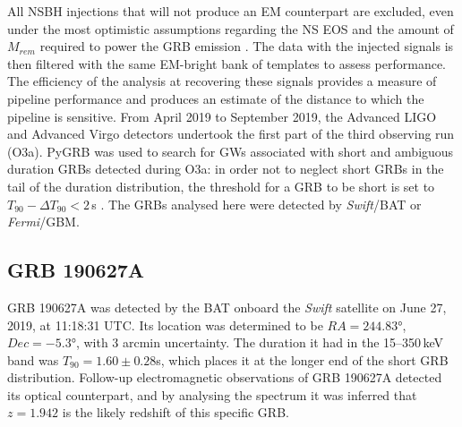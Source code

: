 \documentclass[binding=0.6cm, LaM]{sapthesis}
\begin{document}
	All NSBH injections that will not produce an EM counterpart are excluded, 
	even under the most optimistic assumptions regarding the NS EOS and the amount of $M_{rem}$ required to power the GRB emission \cite{}. 
	The data with the injected signals is then filtered with the same EM-bright bank of templates to assess performance. 
	The efficiency of the analysis at recovering these signals provides a measure of pipeline performance 
	and produces an estimate of the distance to which the pipeline is sensitive.
	From April 2019 to September 2019, the Advanced LIGO  and  Advanced  Virgo detectors undertook 
	the first part of the third observing run (O3a).
	PyGRB was used to search for GWs associated with short and ambiguous duration GRBs detected during O3a:
	in order not to neglect short GRBs in the tail of the duration distribution, 
	the threshold for a GRB to be short is set to $T_{90} − \Delta T_{90} < 2\,$s \cite{136}. 
	The GRBs analysed here were detected by {\it Swift}/BAT or {\it Fermi}/GBM.

\subsection{GRB 190627A}
	GRB 190627A was detected by the BAT onboard the {\it Swift} satellite on June 27, 2019, at 11:18:31 UTC.
	Its location was determined to be $RA=\ang{244.83}$, $Dec = \ang{-5.3}$, with 3 arcmin uncertainty.	
	The duration it had in the 15--350\,keV band was $T_{90} = 1.60 \pm 0.28$s, 
	which places it at the longer end of the short GRB distribution. 
	Follow-up electromagnetic observations of GRB 190627A detected its optical counterpart, 
	and by analysing the spectrum it was inferred that $z = 1.942$ is the likely redshift of this specific GRB.
\end{document}
